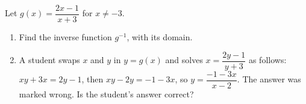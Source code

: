 Let $g(x)=\dfrac{2x-1}{x+3}$ for $x\ne-3$.
\begin{enumerate}
\item[(a)] Find the inverse function $g^{-1}$, with its domain.
\item[(b)] A student swaps $x$ and $y$ in $y=g(x)$ and solves $x=\dfrac{2y-1}{y+3}$ as follows: $xy+3x=2y-1$, then $xy-2y=-1-3x$, so $y=\dfrac{-1-3x}{x-2}$. The answer was marked wrong. Is the student's answer correct?
\end{enumerate}
